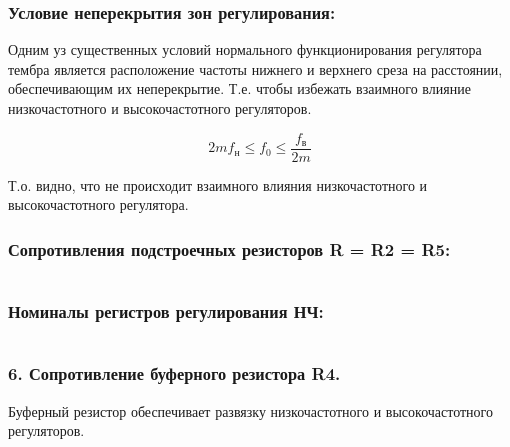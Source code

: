 
\subsubsection{Условие неперекрытия зон регулирования:} %
Одним уз существенных условий нормального функционирования регулятора тембра является расположение частоты нижнего и верхнего среза на расстоянии, обеспечивающим их неперекрытие. Т.е. чтобы избежать взаимного влияние низкочастотного и высокочастотного регуляторов. \par

  \begin{equation}
    \label{eq:equation5_3}
      2 m f_{\text{н}} \leq f_0 \leq \dfrac{f_{\text{в}}}{2m} 
 \end{equation} 
 \begin{equation}
   \label{eq:equation5_4}
    
  \end{equation} 

    Т.о. видно, что не происходит взаимного влияния низкочастотного и высокочастотного регулятора.


\subsubsection{Сопротивления подстроечных резисторов R = R2 = R5:}
\begin{equation}
   \label{eq:equation5_5}
	
\end{equation} 

\subsubsection{ Номиналы регистров регулирования НЧ:}
\begin{equation}
   \label{eq:equation5_6}
   
   \end{equation} 
   \begin{equation}
   \label{eq:equation5_7}
   
   \end{equation} 
   \subsubsection{ 6. Сопротивление буферного  резистора R4.}
   Буферный резистор обеспечивает развязку  низкочастотного и высокочастотного регуляторов. 
   \begin{equation}
   \label{eq:equation5_8}
   
   \end{equation} 
